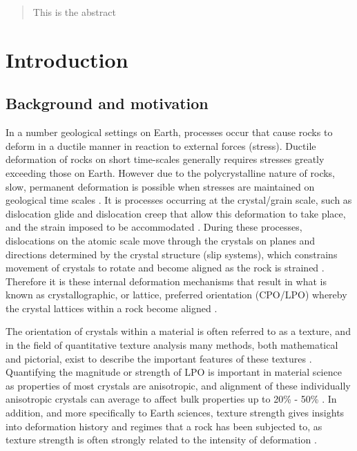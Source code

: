 \documentclass[a4paper,12pt,twoside]{report}
\numberwithin{equation}{chapter}
\begin{document}
\begin{abstract}
This is the abstract
\end{abstract}

\tableofcontents
\listoffigures
\listoftables



\chapter{Introduction} \label{chap:intro}
\vspace{-1cm}


\section{Background and motivation} \label{sec:background}
In a number geological settings on Earth, processes occur that cause rocks to deform in a ductile manner in reaction to external forces (stress). Ductile deformation of rocks on short time-scales generally requires stresses greatly exceeding those on Earth. However due to the polycrystalline nature of rocks, slow, permanent deformation is possible when stresses are maintained on geological time scales \citep{Weiss1985}. It is processes occurring at the crystal/grain scale, such as dislocation glide and dislocation creep that allow this deformation to take place, and the strain imposed to be accommodated \citep{Ashby1972}. During these processes, dislocations on the atomic scale move through the crystals on planes and directions determined by the crystal structure (slip systems), which constrains movement of crystals to rotate and become aligned as the rock is strained \citep{Goulding2015}. Therefore it is these internal deformation mechanisms that result in what is known as crystallographic, or lattice, preferred orientation (CPO/LPO) whereby the crystal lattices within a rock become aligned \citep{Price1985}.   

The orientation of crystals within a material is often referred to as a texture, and in the field of quantitative texture analysis many methods, both mathematical and pictorial, exist to describe the important features of these textures \citep[for introductory texts see][]{bunge1982texture,Bunge1985,Randle2000,Mainprice}. Quantifying the magnitude or strength of LPO is important in material science as properties of most crystals are anisotropic, and alignment of these individually anisotropic crystals can average to affect bulk properties up to 20\% - 50\% \citep{Randle2000}. In addition, and more specifically to Earth sciences, texture strength gives insights into deformation history and regimes that a rock has been subjected to, as texture strength is often strongly related to the intensity of deformation \citep{Weiss1985}.
\end{document}
